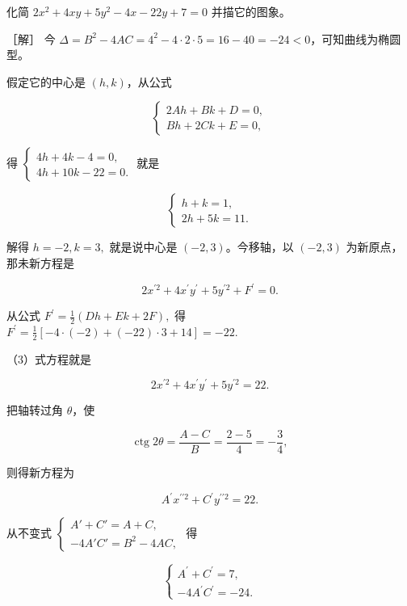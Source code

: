 化简 \(2x^{2}+4xy+5y^{2}-4x-22y+7=0\) 并描它的图象。

［解］ 今
\(\Delta = B^{2} - 4AC = 4^{2} - 4\cdot 2\cdot 5 = 16 - 40 = -24 < 0\)，可知曲线为椭圆型。

假定它的中心是 \((h, k)\)，从公式

\[
\left\{ \begin{array}{l} 2 A h + B k + D = 0, \\ B h + 2 C k + E = 0, \end{array} \right.
\]

得
\(\left\{ \begin{array}{l} 4h + 4k - 4 = 0, \\ 4h + 10k - 22 = 0. \end{array} \right.\)
就是

\[
\left\{ \begin{array}{l} h + k = 1, \\ 2 h + 5 k = 11. \end{array} \right. \tag {1}
\]

解得 \(h = -2, k = 3,\) 就是说中心是 \((-2,3)\)。今移轴，以 \((-2,3)\)
为新原点，那未新方程是

\[
2 x^{\prime 2} + 4 x^{\prime} y^{\prime} + 5 y^{\prime 2} + F^{\prime} = 0. \tag {3}
\]

从公式 \(F^{\prime} = \frac{1}{2} (Dh + Ek + 2F),\) 得
\(F^{\prime} = \frac{1}{2} [-4\cdot (-2) + (-22)\cdot 3 + 14] = -22.\)

（3）式方程就是

\[
2 x^{\prime 2} + 4 x^{\prime} y^{\prime} + 5 y^{\prime 2} = 22.
\]

把轴转过角 \(\theta\)，使

\[
\operatorname{ctg} 2 \theta = \frac {A - C}{B} = \frac {2 - 5}{4} = - \frac {3}{4},
\]

则得新方程为

\[
A^{\prime} x^{\prime \prime 2} + C^{\prime} y^{\prime \prime 2} = 22. \tag {4}
\]

从不变式
\(\left\{ \begin{array}{l} A' + C' = A + C, \\ -4A'C' = B^2 - 4AC, \end{array} \right.\)
得

\[
\left\{ \begin{array}{l} A^{\prime} + C^{\prime} = 7, \\ - 4 A^{\prime} C^{\prime} = - 24. \end{array} \right. \tag {5}
\]

